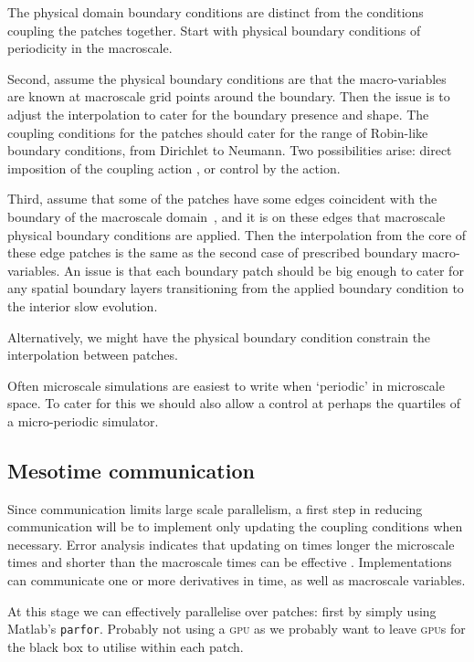 The physical domain boundary conditions are distinct from the conditions coupling the patches together.
Start with physical boundary conditions of periodicity in the macroscale.

Second, assume the physical boundary conditions are that the macro-variables are known at macroscale grid points around the boundary.  
Then the issue is to adjust the interpolation to cater for the boundary presence and shape.
The coupling conditions for the patches should cater for the range of Robin-like boundary conditions, from Dirichlet to Neumann.
Two possibilities arise: direct imposition of the coupling action \citep{Roberts06d}, or control by the action.

Third, assume that some of the patches have some edges coincident with the boundary of the macroscale domain~\XX, and it is on these edges that macroscale physical boundary conditions are applied.
Then the interpolation from the core of these edge patches is the same as the second case of prescribed boundary macro-variables.
An issue is that each boundary patch should be big enough to cater for any spatial boundary layers transitioning from the applied boundary condition to the interior slow evolution.

Alternatively, we might have the physical boundary condition constrain the interpolation between patches.

Often microscale simulations are easiest to write when `periodic' in microscale space.  
To cater for this we should also allow a control at perhaps the quartiles of a micro-periodic simulator.





\subsection{Mesotime communication}

Since communication limits large scale parallelism, a first step in reducing communication will be to implement only updating the coupling conditions when necessary.
Error analysis indicates that updating on times longer the microscale times and shorter than the macroscale times can be effective
\citep{Bunder2015a}.
Implementations can communicate one or more derivatives in time, as well as macroscale variables.

At this stage we can effectively parallelise over patches: first by simply using Matlab's \texttt{parfor}.   
Probably not using a \textsc{gpu} as we probably want to leave \textsc{gpu}s for the black box to utilise within each patch.




